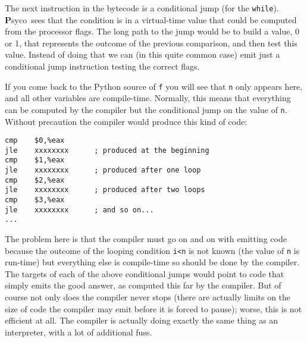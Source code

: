 \documentclass{article}
\def\Psyco{{\bf P}syco}
\def\code#1{\texttt{#1}}
\begin{document}
The next instruction in the bytecode is a conditional jump (for the \code{while}). \Psyco\ sees that the condition is in a virtual-time value that could be computed from the processor flags. The long path to the jump would be to build a value, 0 or 1, that represents the outcome of the previous comparison, and then test this value. Instead of doing that we can (in this quite common case) emit just a conditional jump instruction testing the correct flags.

If you come back to the Python source of \code{f} you will see that \code{n} only appears here, and all other variables are compile-time. Normally, this means that everything can be computed by the compiler but the conditional jump on the value of \code{n}. Without precaution the compiler would produce this kind of code:

\begin{verbatim}
cmp    $0,%eax
jle    xxxxxxxx      ; produced at the beginning
cmp    $1,%eax
jle    xxxxxxxx      ; produced after one loop
cmp    $2,%eax
jle    xxxxxxxx      ; produced after two loops
cmp    $3,%eax
jle    xxxxxxxx      ; and so on...
...
\end{verbatim}

The problem here is that the compiler must go on and on with emitting code because the outcome of the looping condition \code{i<n} is not known (the value of \code{n} is run-time) but everything else is compile-time so should be done by the compiler. The targets of each of the above conditional jumps would point to code that simply emits the good answer, as computed this far by the compiler. But of course not only does the compiler never stops (there are actually limits on the size of code the compiler may emit before it is forced to pause); worse, this is not efficient at all. The compiler is actually doing exactly the same thing as an interpreter, with a lot of additional fuss.
\end{document}
